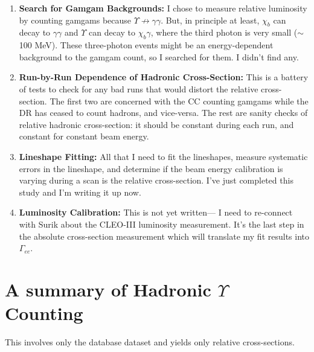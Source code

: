 \documentclass[12pt]{article}
\begin{document}
\begin{enumerate}
  \item {\bf Search for Gamgam Backgrounds:} I chose to measure
    relative luminosity by counting gamgams because $\Upsilon \not\to
    \gamma\gamma$.  But, in principle at least, $\chi_b$ can decay to
    $\gamma\gamma$ and $\Upsilon$ can decay to $\chi_b\gamma$, where
    the third photon is very small ($\sim$100 MeV).  These
    three-photon events might be an energy-dependent background to the
    gamgam count, so I searched for them.  I didn't find any.

  \item {\bf Run-by-Run Dependence of Hadronic Cross-Section:} This is
    a battery of tests to check for any bad runs that would distort
    the relative cross-section.  The first two are concerned with the
    CC counting gamgams while the DR has ceased to count hadrons, and
    vice-versa.  The rest are sanity checks of relative hadronic
    cross-section: it should be constant during each run, and constant
    for constant beam energy.

  \item {\bf Lineshape Fitting:} All that I need to fit the
    lineshapes, measure systematic errors in the lineshape, and
    determine if the beam energy calibration is varying during a scan
    is the relative cross-section.  I've just completed this study and
    I'm writing it up now.

  \item {\bf Luminosity Calibration:} This is not yet written--- I
    need to re-connect with Surik about the CLEO-III luminosity
    measurement.  It's the last step in the absolute cross-section
    measurement which will translate my fit results into
    $\Gamma_{ee}$.

\end{enumerate}

\section{A summary of Hadronic $\Upsilon$ Counting}

This involves only the database dataset and yields only relative
cross-sections.
\end{document}
